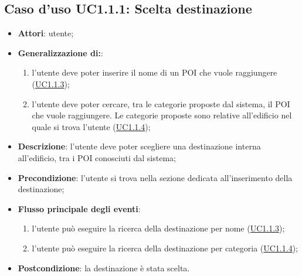 \documentclass[../AnalisiDeiRequisiti.tex]{subfiles}
\begin{document}
\subsection{Caso d'uso UC1.1.1: Scelta destinazione}

\begin{itemize}
\item \textbf{Attori}: utente;

        \item \textbf{Generalizzazione di:}:
          \begin{enumerate}
          \item l'utente deve poter inserire il nome di un POI che vuole raggiungere (\hyperlink{UC1.1.3}{UC1.1.3});
          \item l'utente deve poter cercare, tra le categorie proposte dal sistema, il POI che vuole raggiungere. Le categorie proposte sono relative all'edificio nel quale si trova l'utente (\hyperlink{UC1.1.4}{UC1.1.4});

      \end{enumerate}
\item \textbf{Descrizione}: l'utente deve poter scegliere una destinazione interna all'edificio, tra i POI conosciuti dal sistema; 
      \item \textbf{Precondizione}: l'utente si trova nella sezione dedicata all'inserimento della destinazione;

        \item \textbf{Flusso principale degli eventi}:
          \begin{enumerate}
          \item l'utente può eseguire la ricerca della destinazione per nome (\hyperlink{UC1.1.3}{UC1.1.3});
          \item l'utente può eseguire la ricerca della destinazione per categoria (\hyperlink{UC1.1.4}{UC1.1.4});

      \end{enumerate}
    \item \textbf{Postcondizione}: la destinazione è stata scelta.
  \end{itemize}
\hypertarget{UC1.1.2}{}
\end{document}
